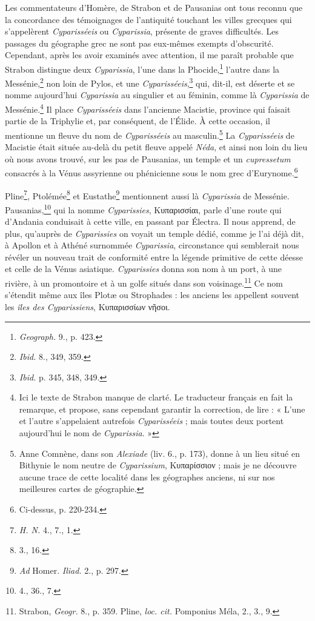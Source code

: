 \documentclass{article}
\begin{document}
Les commentateurs d'Homère, de Strabon et de Pausanias ont tous reconnu que la concordance des témoignages de l'antiquité touchant les villes grecques qui s'appelèrent \emph{Cyparisséeis} ou \emph{Cyparissia}, présente de graves difficultés. Les passages du géographe grec ne sont pas eux-mêmes exempts d'obscurité. Cependant, après les avoir examinés avec attention, il me paraît probable que Strabon distingue deux \emph{Cyparissia}, l'une dans la Phocide,\footnote{\emph{Geograph.} 9., p. 423.} l'autre dans la Messénie,\footnote{\emph{Ibid.} 8., 349, 359.} non loin de Pylos, et une \emph{Cyparisséeis},\footnote{\emph{Ibid.} p. 345, 348, 349.} qui, dit-il, est déserte et se nomme aujourd'hui \emph{Cyparissia} au singulier et au féminin, comme là \emph{Cyparissia} de Messénie.\footnote{Ici le texte de Strabon manque de clarté. Le traducteur français en fait la remarque, et propose, sans cependant garantir la correction, de lire : « L'une et l'autre s'appelaient autrefois \emph{Cyparisséeis} ; mais toutes deux portent aujourd'hui le nom de \emph{Cyparissia}. »} Il place \emph{Cyparisséeis} dans l'ancienne Macistie, province qui faisait partie de la Triphylie et, par conséquent, de l'Élide. À cette occasion, il mentionne un fleuve du nom de \emph{Cyparisséeis} au masculin.\footnote{Anne Comnène, dans son \emph{Alexiade} (liv. 6., p. 173), donne à un lieu situé en Bithynie le nom neutre de \emph{Cyparissium}, \textgreek{Κυπαρίσσιον} ; mais je ne découvre aucune trace de cette localité dans les géographes anciens, ni sur nos meilleures cartes de géographie.} La \emph{Cyparisséeis} de Macistie était située au-delà du petit fleuve appelé \emph{Néda}, et ainsi non loin du lieu où nous avons trouvé, sur les pas de Pausanias, un temple et un \emph{cupressetum} consacrés à la Vénus assyrienne ou phénicienne sous le nom grec d'Eurynome.\footnote{Ci-dessus, p. 220-234.}

Pline\footnote{\emph{H. N.} 4., 7., 1.}, Ptolémée\footnote{3., 16.} et Eustathe\footnote{\emph{Ad} Homer. \emph{Iliad.} 2., p. 297.} mentionnent aussi là \emph{Cyparissia} de Messénie. Pausanias,\footnote{4., 36., 7.} qui la nomme \emph{Cyparissies}, \textgreek{Κυπαρισσίαι}, parle d'une route qui d'Andania conduisait à cette ville, en passant par Électra. Il nous apprend, de plus, qu'auprès de \emph{Cyparissies} on voyait un temple dédié, comme je l'ai déjà dit, à Apollon et à Athéné surnommée \emph{Cyparissia}, circonstance qui semblerait nous révéler un nouveau trait de conformité entre la légende primitive de cette déesse et celle de la Vénus asiatique. \emph{Cyparissies} donna son nom à un port, à une rivière, à un promontoire et à un golfe situés dans son voisinage.\footnote{Strabon, \emph{Geogr.} 8., p. 359. Pline, \emph{loc. cit.} Pomponius Méla, 2., 3., 9.} Ce nom s'étendit même aux îles Plotæ ou Strophades : les anciens les appellent souvent les \emph{îles des Cyparissiens}, \textgreek{Κυπαρισσίων νῆσοι}.
\end{document}
